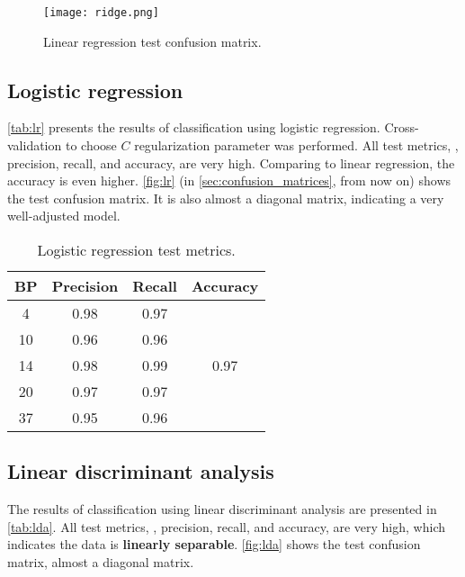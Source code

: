         \begin{figure}[H]
                \centering
                \texttt{[image: ridge.png]}
                \caption{Linear regression test confusion matrix.}
                \label{fig:rigde}
        \end{figure}

    \subsection{Logistic regression}

        \autoref{tab:lr} presents the results of classification using logistic regression. Cross-validation to choose $C$ regularization parameter was performed. All test metrics, \ie, precision, recall, and accuracy, are very high. Comparing to linear regression, the accuracy is even higher. \autoref{fig:lr} (in \autoref{sec:confusion_matrices}, from now on) shows the test confusion matrix. It is also almost a diagonal matrix, indicating a very well-adjusted model.

        \begin{table}[H]
                \centering
                \caption{Logistic regression test metrics.}
                \label{tab:lr}
                \begin{tabular}{c|cc|c}
                BP & Precision & Recall & Accuracy              \\ \hline
                4  & 0.98      & 0.97   & \multirow{5}{*}{0.97} \\
                10 & 0.96      & 0.96   &                       \\
                14 & 0.98      & 0.99   &                       \\
                20 & 0.97      & 0.97   &                       \\
                37 & 0.95      & 0.96   &                      
                \end{tabular}
        \end{table}

    \subsection{Linear discriminant analysis}

        The results of classification using linear discriminant analysis are presented in \autoref{tab:lda}. All test metrics, \ie, precision, recall, and accuracy, are very high, which indicates the data is \textbf{linearly separable}. \autoref{fig:lda} shows the test confusion matrix, almost a diagonal matrix.

